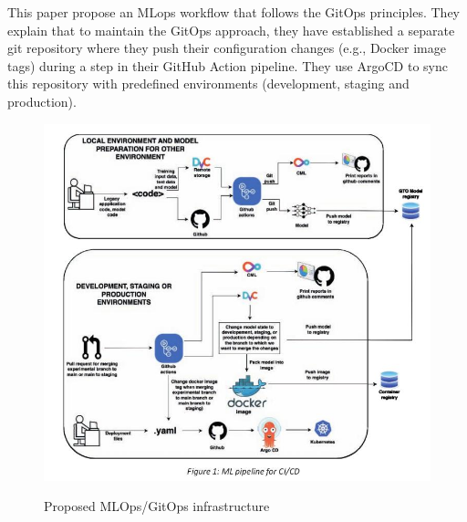 This paper\cite{mlops-gitops} propose an MLops workflow that follows the GitOps principles.
They explain that to maintain the GitOps approach, they have established a separate git repository
where they push their configuration changes (e.g., Docker image tags) during a step in their GitHub Action pipeline.
They use ArgoCD to sync this repository with predefined environments (development, staging and production).

\begin{figure}[!htbp]
    \caption{Proposed MLOps/GitOps infrastructure\cite{mlops-gitops}}
    \centering
    \includegraphics[scale=0.3]{images/mlops-gitops}
    \label{fig:mlops-gitops}
\end{figure}
